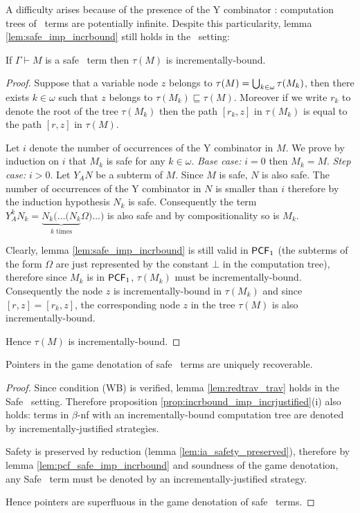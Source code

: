 A difficulty arises because of the presence of the Y combinator :
computation trees of \pcf\ terms are potentially infinite. Despite
this particularity, lemma \ref{lem:safe_imp_incrbound} still holds
in the \pcf\ setting:
\begin{lem}
\label{lem:pcf_safe_imp_incrbound} If $\Gamma \vdash M$ is a safe
\pcf\ term then $\tau(M)$ is incrementally-bound.
\end{lem}
\begin{proof}
Suppose that a variable node $z$ belongs to $\tau(M) =
\bigcup_{k\in\omega} \tau(M_k)$, then there exists $k\in \omega$ such
that $z$ belongs to $\tau(M_k) \sqsubseteq \tau(M)$. Moreover if we
write $r_k$ to denote the root of the tree $\tau(M_k)$ then the path
$[r_k,z]$ in $\tau(M_k)$ is equal to the path $[r,z]$ in $\tau(M)$.

Let $i$ denote the number of occurrences of the Y combinator in $M$.
We prove by induction on $i$ that $M_k$ is safe for any $k\in
\omega$. \emph{Base case:} $i=0$ then $M_k = M$. \emph{Step case:}
$i>0$. Let $Y_A N$ be a subterm of $M$. Since $M$ is safe, $N$ is
also safe. The number of occurrences of the Y combinator in $N$ is
smaller than $i$ therefore by the induction hypothesis $N_k$ is
safe. Consequently the term $Y_A^k N_k = \underbrace{N_k ( \ldots (
N_k}_{k \mbox{ times}} \Omega ) \ldots )$ is also safe and by
compositionality so is $M_k$.

Clearly, lemma \ref{lem:safe_imp_incrbound} is still valid in
$\textsf{PCF}_1$ (the subterms of the form $\Omega$ are just represented by
the constant $\bot$ in the computation tree), therefore since $M_k$
is in $\textsf{PCF}_1$, $\tau(M_k)$ must be incrementally-bound.
Consequently the node $z$ is incrementally-bound in $\tau(M_k)$ and
since $[r,z]=[r_k,z]$, the corresponding node $z$ in the tree
$\tau(M)$ is also incrementally-bound.

Hence $\tau(M)$ is incrementally-bound.
\end{proof}

\begin{thm}
Pointers in the game denotation of safe \pcf\ terms are uniquely
recoverable.
\end{thm}
\begin{proof}
Since condition (WB) is verified, lemma \ref{lem:redtrav_trav} holds
in the Safe \pcf\ setting. Therefore proposition
\ref{prop:incrbound_imp_incrjustified}(i) also holds: terms in
$\beta$-nf with an incrementally-bound computation tree are denoted
by incrementally-justified strategies.

Safety is preserved by reduction (lemma
\ref{lem:ia_safety_preserved}), therefore by lemma
\ref{lem:pcf_safe_imp_incrbound} and soundness of the game
denotation, any Safe \pcf\ term must be denoted by an
incrementally-justified strategy.

Hence pointers are superfluous in the game denotation of safe \pcf\
terms.
\end{proof}

